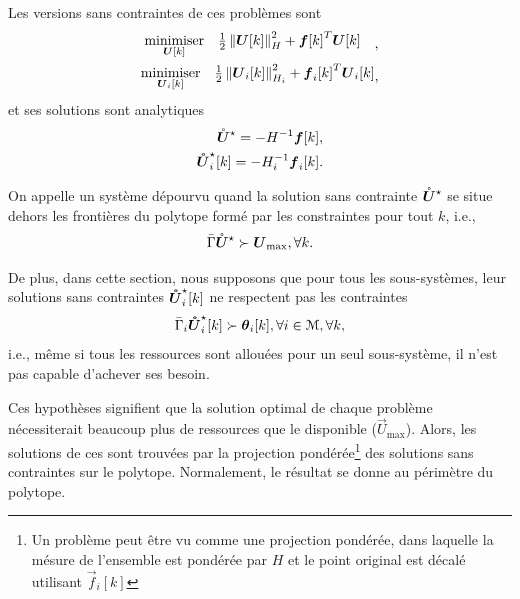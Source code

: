 \documentclass[../main.tex]{subfiles}
\begin{document}
Les versions sans contraintes de ces problèmes sont
\begin{align}
  \label{eq:qp_standard_form_unconstrained_fr}
  \begin{aligned}
    \begin{matrix}
      \mathop{\textrm{minimiser}}\limits_{\boldsymbol{U}[k]} &
                                                 \frac{1}{2}\left\lVert\boldsymbol{U}[k]\right\rVert^{2}_{H} + {\boldsymbol{f}[k]}^{T}\boldsymbol{U}[k] &\\
    \end{matrix},
  \end{aligned}\\
  \label{eq:DOP_local_unconstrained_fr}
  \begin{aligned}
    \begin{matrix}
    \mathop{\textrm{minimiser}}\limits_{\boldsymbol{U}_{i}[k]}&\frac{1}{2}\left\lVert\boldsymbol{U}_{i}[k]\right\rVert^{2}_{H_{i}} + {\boldsymbol{f}_{i}[k]}^{T}\boldsymbol{U}_{i}[k]\\
    \end{matrix},
  \end{aligned}
\end{align}
et ses solutions sont analytiques~\cite{BoydVandenberghe2004}
\begin{align}
  \label{eq:qp_standard_form_unconstrained_solution_fr}
  \optuncU=-H^{-1}\vec{f}[k],\\
  \label{eq:DOP_local_unconstrained_solution_fr}
  \optuncUik=-H_{i}^{-1}\vec{f}_{i}[k].
\end{align}

On appelle un système dépourvu quand la solution sans contrainte ${\mathring{\boldsymbol{U}}^{\star}}$ se situe dehors les frontières du polytope formé par les constraintes pour tout $k$, i.e.,
\begin{equation}
\bar{\Gamma}{\mathring{\boldsymbol{U}}^{\star}}\succ {\boldsymbol{U}}_{\text{max}}, \forall k.
\end{equation}

De plus, dans cette section, nous supposons que pour tous les sous-systèmes, leur solutions sans contraintes $\optuncUik$ ne respectent pas les contraintes
\begin{equation}
\bar{\Gamma}_{i}\optuncUik\succ \thetaik, \forall i\in\set{M}, \forall k,
\end{equation}
i.e., même si tous les ressources sont allouées pour un seul sous-système, il n'est pas capable d'achever ses besoin.

Ces hypothèses signifient que la solution optimal de chaque problème nécessiterait beaucoup plus de ressources que le disponible ($\vec{U}_{\max}$).
Alors, les solutions de ces \qp{} sont trouvées par la projection pondérée\footnote{Un problème \qp{} peut être vu comme une projection pondérée, dans laquelle la mésure de l'ensemble est pondérée par $H$ et le point original est décalé utilisant $\vec{f}_i[k]$} des solutions sans contraintes sur le polytope.
Normalement, le résultat se donne au périmètre du polytope.
\end{document}
